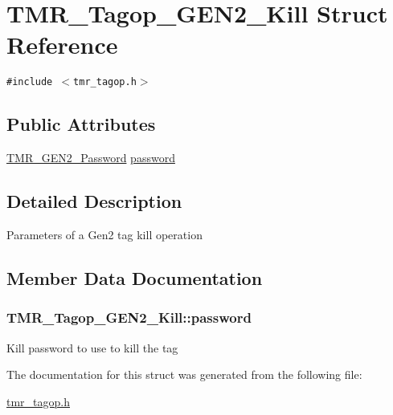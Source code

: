 \hypertarget{struct_t_m_r___tagop___g_e_n2___kill}{
\section{TMR\_\-Tagop\_\-GEN2\_\-Kill Struct Reference}
\label{struct_t_m_r___tagop___g_e_n2___kill}
}
{\tt \#include $<$tmr\_\-tagop.h$>$}

\subsection*{Public Attributes}
\begin{CompactItemize}
\item 
\hyperlink{tmr__gen2_8h_75cb57ee85289b5746c4006a8e66e261}{TMR\_\-GEN2\_\-Password} \hyperlink{struct_t_m_r___tagop___g_e_n2___kill_ca5c80e97a9347b8ab5b50574d860f5e}{password}
\end{CompactItemize}


\subsection{Detailed Description}
Parameters of a Gen2 tag kill operation 

\subsection{Member Data Documentation}
\hypertarget{struct_t_m_r___tagop___g_e_n2___kill_ca5c80e97a9347b8ab5b50574d860f5e}{
\subsubsection[{password}]{ {\bf TMR\_\-Tagop\_\-GEN2\_\-Kill::password}}}
\label{struct_t_m_r___tagop___g_e_n2___kill_ca5c80e97a9347b8ab5b50574d860f5e}


Kill password to use to kill the tag 

The documentation for this struct was generated from the following file:\begin{CompactItemize}
\item 
\hyperlink{tmr__tagop_8h}{tmr\_\-tagop.h}\end{CompactItemize}
